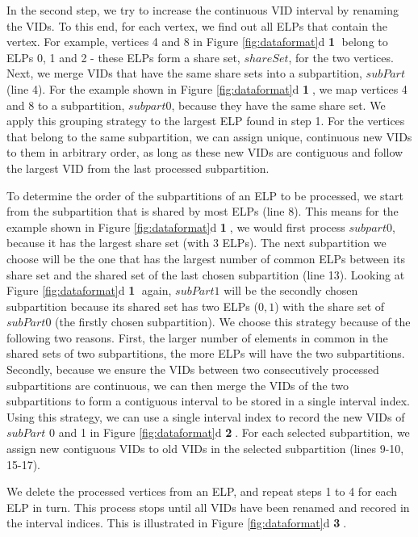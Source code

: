  In the second step, we try to increase the continuous VID interval by renaming the VIDs. To this end, for
each vertex, we find out all ELPs that contain the vertex. For example, vertices 4 and 8 in Figure \ref{fig:dataformat}d \textbf{\textcircled{1}} belong to ELPs 0,
1 and 2 - these ELPs form a share set, $shareSet$, for the two vertices. Next, we merge VIDs that have the same share sets into a subpartition, $subPart$ (line 4). For the example shown in Figure \ref{fig:dataformat}d \textbf{\textcircled{1}}, we map vertices 4 and 8 to a subpartition, $subpart 0$, because they have the same share set. We apply this grouping strategy to the largest ELP found in step 1. For the vertices that belong to the same subpartition, we can assign unique, continuous new VIDs to them in arbitrary order, as long as these new VIDs are contiguous
and follow the largest VID from the last processed subpartition.

 To determine the order of the subpartitions of an ELP to be processed, we start from the
subpartition that is shared by most ELPs (line 8).  This means for the example shown in Figure \ref{fig:dataformat}d \textbf{\textcircled{1}}, we would first process
$subpart 0$, because it has the largest share set (with 3 ELPs).  The next subpartition we choose will be the one that has the largest number of common ELPs between its share set and the shared set of the last chosen subpartition (line 13). Looking at Figure \ref{fig:dataformat}d \textbf{\textcircled{1}} again, $subPart 1$ will be the secondly chosen subpartition because its shared set has two ELPs ($0, 1$) with the share set of $subPart 0$ (the firstly chosen subpartition). We choose this strategy because of the following two reasons.
First, the larger number of elements in common in the shared sets of two subpartitions, the more ELPs will have the two subpartitions.
Secondly, because we ensure the VIDs between two consecutively processed subpartitions are continuous, we can then merge the VIDs of the
two subpartitions to form a contiguous interval to be stored in a single interval index. Using this strategy, we can use a single interval index to record the new VIDs of $subPart$ 0 and 1 in Figure \ref{fig:dataformat}d \textbf{\textcircled{2}}. For each selected subpartition, we assign new contiguous VIDs to old VIDs in the selected subpartition (lines 9-10, 15-17).


 We delete the processed vertices from an ELP, and repeat steps 1 to 4 for each ELP in turn. This
process stops until all VIDs have been renamed and recored in the interval indices. This is illustrated in Figure \ref{fig:dataformat}d \textbf{\textcircled{3}}.


